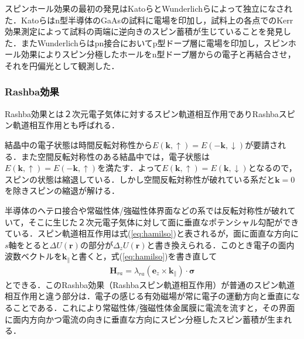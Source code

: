 スピンホール効果の最初の発見はKatoら\cite{kato2004observation}とWunderlichら\cite{wunderlich2005experimental}によって独立になされた．Katoらはn型半導体のGaAsの試料に電場を印加し，試料上の各点でのKerr効果測定によって試料の両端に逆向きのスピン蓄積が生じていることを発見した．またWunderlichらはpn接合においてp型ドープ層に電場を印加し，スピンホール効果によりスピン分極したホールをn型ドープ層からの電子と再結合させ，それを円偏光として観測した．
\subsubsection{Rashba効果}
Rashba効果とは２次元電子気体に対するスピン軌道相互作用でありRashbaスピン軌道相互作用\cite{bychkov1984oscillatory}とも呼ばれる．

結晶中の電子状態は時間反転対称性から$E(\bm{k},\uparrow)=E(-\bm{k},\downarrow)$が要請される．また空間反転対称性のある結晶中では，電子状態は$E(\bm{k},\uparrow)=E(-\bm{k},\uparrow)$を満たす．よって$E(\bm{k},\uparrow)=E(\bm{k},\downarrow)$となるので，スピンの状態は縮退している．しかし空間反転対称性が破れている系だと$\bm{k}=0$を除きスピンの縮退が解ける．

半導体のヘテロ接合や常磁性体/強磁性体界面などの系では反転対称性が破れていて，そこに生じた２次元電子気体に対して面に垂直なポテンシャル勾配ができている．スピン軌道相互作用は式(\ref{eq:hamilso})と表されるが，面に面直な方向に$s$軸をとると$\Delta U(\bm{r})$の部分が$\Delta_{z} U(\bm{r})$と書き換えられる．このとき電子の面内波数ベクトルを$\bm{k}_{\parallel}$と書くと，式(\ref{eq:hamilso})を書き直して
\begin{eqnarray}
\bm{H}_{ra} = \lambda_{ra}(\bm{e}_{z}\times\bm{k}_{\parallel})\cdot\bm{\sigma}
\label{eq:hamilra}
\end{eqnarray}
とできる．このRashba効果（Rashbaスピン軌道相互作用）が普通のスピン軌道相互作用と違う部分は．電子の感じる有効磁場が常に電子の運動方向と垂直になることである．これにより常磁性体/強磁性体金属膜に電流を流すと，その界面に面内方向かつ電流の向きに垂直な方向にスピン分極したスピン蓄積が生まれる．

